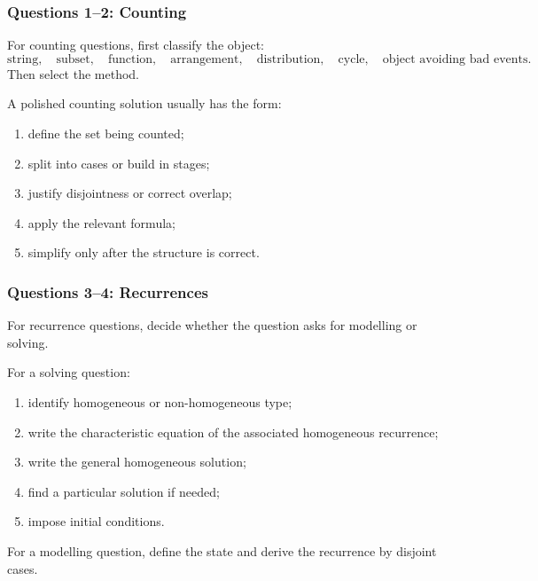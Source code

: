 \subsubsection{Questions 1--2: Counting}

For counting questions, first classify the object:
\[
\text{string},\quad
\text{subset},\quad
\text{function},\quad
\text{arrangement},\quad
\text{distribution},\quad
\text{cycle},\quad
\text{object avoiding bad events}.
\]
Then select the method.

\begin{examtip}[title={Counting solution template}]
A polished counting solution usually has the form:
\begin{enumerate}[leftmargin=*]
    \item define the set being counted;
    \item split into cases or build in stages;
    \item justify disjointness or correct overlap;
    \item apply the relevant formula;
    \item simplify only after the structure is correct.
\end{enumerate}
\end{examtip}

\subsubsection{Questions 3--4: Recurrences}

For recurrence questions, decide whether the question asks for modelling or solving.

\begin{examtip}[title={Recurrence solution template}]
For a solving question:
\begin{enumerate}[leftmargin=*]
    \item identify homogeneous or non-homogeneous type;
    \item write the characteristic equation of the associated homogeneous recurrence;
    \item write the general homogeneous solution;
    \item find a particular solution if needed;
    \item impose initial conditions.
\end{enumerate}
For a modelling question, define the state and derive the recurrence by disjoint cases.
\end{examtip}


